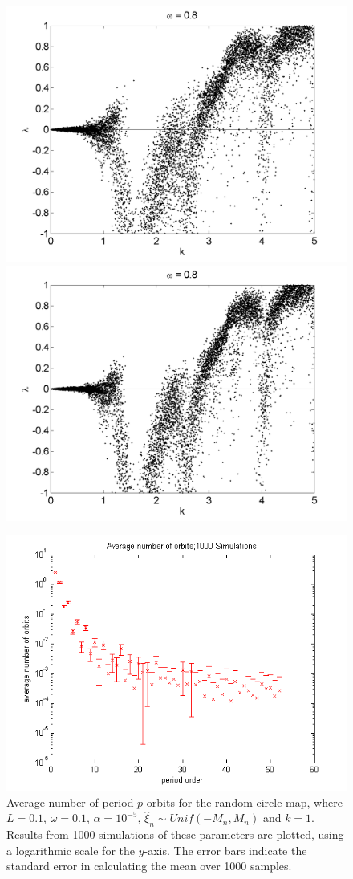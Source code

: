 \begin{figure}[!h]
\includegraphics[width=.5\textwidth]{figs/rcirc_u_lyap_10000_L_05_w_08_k.png}\hfill
\includegraphics[width=.5\textwidth]{figs/rcirc_u_lyap_10000_L_07_w_08_k.png}\\
\end{figure}

\begin{figure}[H]\linespread{1}
\caption[Average number of period $p$ orbits for the random circle
map]{Average number of period $p$ orbits for the random circle map,
  where $L=0.1$, $\omega =0.1$, $\alpha = 10^{-5}$, $\hat{\xi}_n\sim
  Unif(-M_n,M_n)$ and $k=1$. Results from 1000 simulations of these
  parameters are plotted, using a logarithmic scale for the
  $y$-axis. The error bars indicate the standard error in calculating the mean over 1000 samples.}\label{fig:avgcircorbs}
	\begin{center}
		\includegraphics[scale=0.65]{figs/rcirc_avg_num_1000_sim_logscale.png}
	\end{center}
\end{figure}

